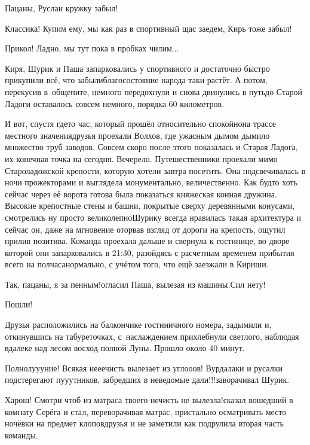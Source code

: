 \diagdash Пацаны, Руслан кружку забыл!

\diagdash Классика! Купим ему, мы как раз в спортивный щас заедем, Кирь тоже забыл!

\diagdash Прикол! Ладно, мы тут пока в пробках чилим$\ldots$

Киря, Шурик и Паша запарковались у спортивного и достаточно быстро прикупили всё, что забыли\mdash благосостояние народа таки растёт. А потом, перекусив в~общепите, немного передохнули и снова двинулись в путь\mdash до Старой Ладоги оставалось совсем немного, порядка 60 километров.

И вот, спустя где\sdash то час, который прошёл относительно спокойно\mdash на трассе местного значения\mdash друзья проехали Волхов, где ужасным дымом дымило множество труб заводов. Совсем скоро после этого показалась и Старая Ладога, их конечная точка на сегодня. Вечерело. Путешественники проехали мимо Староладожской крепости, которую хотели завтра посетить. Она подсвечивалась в ночи прожекторами и выглядела монументально, величественно. Как будто хоть сейчас через её ворота готова была показаться княжеская конная дружина. Высокие крепостные стены и башни, покрытые сверху деревянными конусами, смотрелись ну просто великолепно\mdash Шурику всегда нравилась такая архитектура и сейчас он, даже на мгновение оторвав взгляд от дороги на крепость, ощутил прилив позитива. Команда проехала дальше и свернула к гостинице, во дворе которой они запарковались в 21:30, разойдясь с расчетным временем прибытия всего на полчаса\mdash нормально, с учётом того, что ещё заезжали в Кириши.

\diagdash Так, пацаны, я за пенным!\mdash огласил Паша, вылезая из машины.\mdash Сил нету!

\diagdash Пошли!

Друзья расположились на балкончике гостиничного номера, задымили и, откинувшись на табуреточках, с~наслаждением прихлебнули светлого, наблюдая вдалеке над лесом восход полной Луны. Прошло около 40 минут.

\diagdash Полнолу\sdash у\sdash уние! Всякая не\sdash е\sdash ечисть вылезает из угло\sdash о\sdash ов! Вурдалаки и русалки подстерегают пу\sdash у\sdash утников, забредших в неведомые дали!!!\mdash заворачивал Шурик.

\diagdash Харош! Смотри чтоб из матраса твоего нечисть не вылезла!\mdash сказал вошедший в комнату Серёга и стал, переворачивая матрас, пристально осматривать место ночёвки на предмет клопов\mdash друзья и не заметили как подрулила вторая часть команды.

